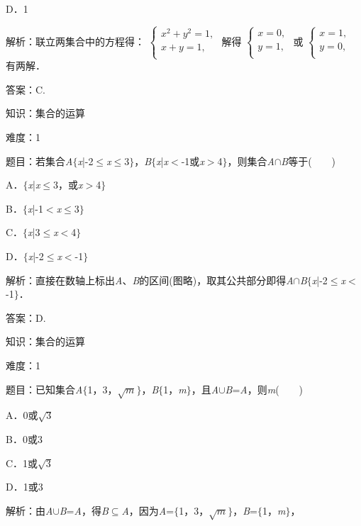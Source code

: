 \documentclass{article} %
\begin{document}
D．1

解析：联立两集合中的方程得：
$\left\{
\begin{array}{l}
	x^{2}+y^{2}=1,\\
	x+y=1,\\
\end{array}
\right.$
解得
$\left\{
\begin{array}{l}
	x=0,\\
	y=1,\\
\end{array}
\right.$
或
$\left\{
\begin{array}{l}
x=1,\\
y=0,\\
\end{array}
\right.$
有两解．

答案：C.

知识：集合的运算

难度：1

题目：若集合\textit{A}$\mathrm{\{}$\textit{x}|-2$\mathrm{\le}$\textit{x}$\mathrm{\le}$3$\mathrm{\}}$，\textit{B}$\mathrm{\{}$\textit{x}|\textit{x}$\mathrm{<}$-1或\textit{x}$\mathrm{>}$4$\mathrm{\}}$，则集合\textit{A}$\mathrm{\cap}$\textit{B}等于(　　)

A．$\mathrm{\{}$\textit{x}|\textit{x}$\mathrm{\le}$3，或\textit{x}$\mathrm{>}$4$\mathrm{\}}$   

B．$\mathrm{\{}$\textit{x}|-1$\mathrm{<}$\textit{x}$\mathrm{\le}$3$\mathrm{\}}$

C．$\mathrm{\{}$\textit{x}|3$\mathrm{\le}$\textit{x}$\mathrm{<}$4$\mathrm{\}}$   

D．$\mathrm{\{}$\textit{x}|-2$\mathrm{\le}$\textit{x}$\mathrm{<}$-1$\mathrm{\}}$

解析：直接在数轴上标出\textit{A}、\textit{B}的区间(图略)，取其公共部分即得\textit{A}$\mathrm{\cap}$\textit{B}$\mathrm{\{}$\textit{x}|-2$\mathrm{\le}$\textit{x}$\mathrm{<}$-1$\mathrm{\}}$．

答案：D.

知识：集合的运算

难度：1

题目：已知集合\textit{A}$\mathrm{\{}$1，3，$\sqrt{m}$$\mathrm{\}}$，\textit{B}$\mathrm{\{}$1，\textit{m}$\mathrm{\}}$，且\textit{A}$\mathrm{\cup}$\textit{B}=\textit{A}，则\textit{m}(　　)

A．0或$\sqrt{3}$

B．0或3

C．1或$\sqrt{3}$ 

D．1或3

解析：由\textit{A}$\mathrm{\cup}$\textit{B}=\textit{A}，得\textit{B}$\mathrm{\subseteq}$\textit{A}，因为\textit{A}=$\mathrm{\{}$1，3，$\sqrt{m}$$\mathrm{\}}$，\textit{B}=$\mathrm{\{}$1，\textit{m}$\mathrm{\}}$，
\end{document}
